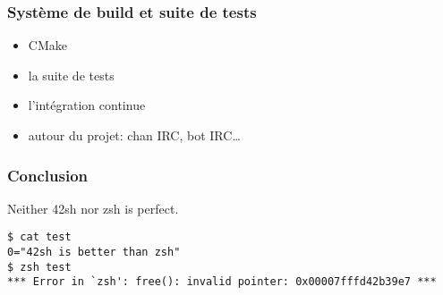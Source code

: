 \documentclass{beamer}
\begin{document}
\begin{frame}
    \frametitle{Système de build et suite de tests}
    \begin{itemize}
        \item CMake
        \item la suite de tests
        \item l’intégration continue
        \item autour du projet: chan IRC, bot IRC\ldots
    \end{itemize}
\end{frame}

\begin{frame} [fragile]
    \frametitle{Conclusion}
    Neither 42sh nor zsh is perfect.
\begin{verbatim}
$ cat test
0="42sh is better than zsh"
$ zsh test
*** Error in `zsh': free(): invalid pointer: 0x00007fffd42b39e7 ***
\end{verbatim}
\end{frame}
\end{document}
